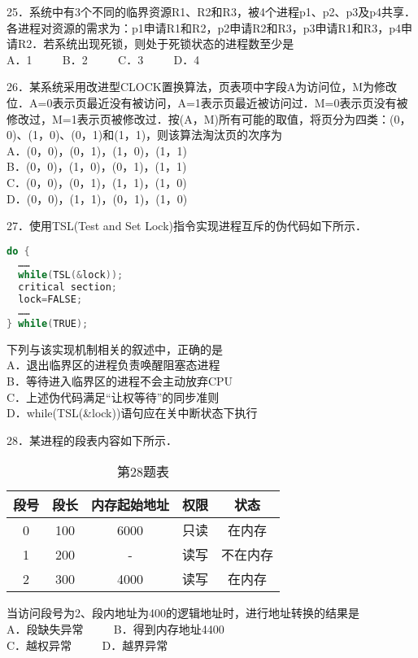 25．系统中有3个不同的临界资源R1、R2和R3，被4个进程p1、p2、p3及p4共享．各进程对资源的需求为：p1申请R1和R2，p2申请R2和R3，p3申请R1和R3，p4申请R2．若系统出现死锁，则处于死锁状态的进程数至少是 \\
A．1 $\qquad$ B．2 $\qquad$ C．3 $\qquad$ D．4

26．某系统采用改进型CLOCK置换算法，页表项中字段A为访问位，M为修改位．A=0表示页最近没有被访问，A=1表示页最近被访问过．M=0表示页没有被修改过，M=1表示页被修改过．按(A，M)所有可能的取值，将页分为四类：(0，0)、(1，0)、(0，1)和(1，1)，则该算法淘汰页的次序为 \\
A．(0，0)，(0，1)，(1，0)，(1，1) \\
B．(0，0)，(1，0)，(0，1)，(1，1) \\
C．(0，0)，(0，1)，(1，1)，(1，0) \\
D．(0，0)，(1，1)，(0，1)，(1，0)

27．使用TSL(Test and Set Lock)指令实现进程互斥的伪代码如下所示． \\
\begin{lstlisting}[language=cpp]
do {
  ……
  while(TSL(&lock));
  critical section;
  lock=FALSE;
  ……
} while(TRUE);
\end{lstlisting}
下列与该实现机制相关的叙述中，正确的是 \\
A．退出临界区的进程负责唤醒阻塞态进程 \\
B．等待进入临界区的进程不会主动放弃CPU \\
C．上述伪代码满足“让权等待”的同步准则 \\
D．while(TSL(&lock))语句应在关中断状态下执行

28．某进程的段表内容如下所示． \\
\begin{table}[ht]
\centering
\caption{第28题表}\label{CSN16_tab4}
\begin{tabular}{|c|c|c|c|c|}
\hline
段号 & 段长 & 内存起始地址 & 权限 & 状态 \\
\hline
0 & 100 & 6000 & 只读 & 在内存 \\
\hline
1 & 200 & - & 读写 & 不在内存 \\
\hline
2 & 300 & 4000 & 读写 & 在内存 \\
\hline
\end{tabular}
\end{table}
当访问段号为2、段内地址为400的逻辑地址时，进行地址转换的结果是 \\
A．段缺失异常 $\qquad$ B．得到内存地址4400 \\
C．越权异常 $\qquad$ D．越界异常

